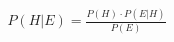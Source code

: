 \documentclass[preview]{standalone}
\begin{document}
\begin{align*}
P(H|E) = \frac{ P(H) \cdot P(E|H) }{ P(E) }
\end{align*}
\end{document}
